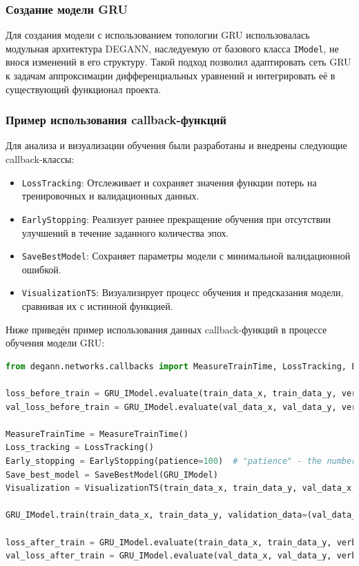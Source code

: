 \subsubsection{Создание модели GRU}
Для создания модели с использованием топологии GRU использовалась модульная архитектура DEGANN, наследуемую от базового класса \texttt{IModel}, не внося изменений в его структуру. Такой подход позволил адаптировать сеть GRU к задачам аппроксимации дифференциальных уравнений и интегрировать её в существующий функционал проекта.

\subsubsection{Пример использования callback-функций}

Для анализа и визуализации обучения были разработаны и внедрены следующие callback-классы:
\begin{itemize}
    \item \texttt{LossTracking}: Отслеживает и сохраняет значения функции потерь на тренировочных и валидационных данных.
    \item \texttt{EarlyStopping}: Реализует раннее прекращение обучения при отсутствии улучшений в течение заданного количества эпох.
    \item \texttt{SaveBestModel}: Сохраняет параметры модели с минимальной валидационной ошибкой.
    \item \texttt{VisualizationTS}: Визуализирует процесс обучения и предсказания модели, сравнивая их с истинной функцией.
\end{itemize}

Ниже приведён пример использования данных callback-функций в процессе обучения модели GRU:

\begin{lstlisting}[language=Python, breaklines, caption=Пример настройки и использования callback-функций]
from degann.networks.callbacks import MeasureTrainTime, LossTracking, EarlyStopping, SaveBestModel, VisualizationTS

loss_before_train = GRU_IModel.evaluate(train_data_x, train_data_y, verbose=0)
val_loss_before_train = GRU_IModel.evaluate(val_data_x, val_data_y, verbose=0)

MeasureTrainTime = MeasureTrainTime()
Loss_tracking = LossTracking()
Early_stopping = EarlyStopping(patience=100)  # "patience" - the number of epochs without improvement
Save_best_model = SaveBestModel(GRU_IModel)
Visualization = VisualizationTS(train_data_x, train_data_y, val_data_x, val_data_y, name_dataset.split('_')[0], funcs)

GRU_IModel.train(train_data_x, train_data_y, validation_data=(val_data_x, val_data_y), epochs=epochs, verbose=0, callbacks=[MeasureTrainTime, Loss_tracking, Early_stopping, Save_best_model, Visualization])

loss_after_train = GRU_IModel.evaluate(train_data_x, train_data_y, verbose=0)
val_loss_after_train = GRU_IModel.evaluate(val_data_x, val_data_y, verbose=0)
\end{lstlisting}


